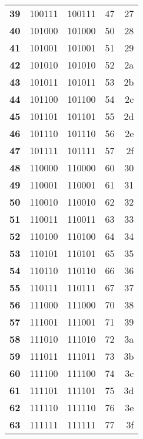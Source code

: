 \documentclass[a4paper]{article}
\begin{document}
\begin{tabular}{|>{\bfseries}r | r | r | r | r |}
39&100111&100111&47&27\\
40&101000&101000&50&28\\
41&101001&101001&51&29\\
42&101010&101010&52&2a\\
43&101011&101011&53&2b\\
44&101100&101100&54&2c\\
45&101101&101101&55&2d\\
46&101110&101110&56&2e\\
47&101111&101111&57&2f\\
48&110000&110000&60&30\\
49&110001&110001&61&31\\
50&110010&110010&62&32\\
51&110011&110011&63&33\\
52&110100&110100&64&34\\
53&110101&110101&65&35\\
54&110110&110110&66&36\\
55&110111&110111&67&37\\
56&111000&111000&70&38\\
57&111001&111001&71&39\\
58&111010&111010&72&3a\\
59&111011&111011&73&3b\\
60&111100&111100&74&3c\\
61&111101&111101&75&3d\\
62&111110&111110&76&3e\\
63&111111&111111&77&3f\\
\end{tabular}
\hspace*{3.0cm}
\end{document}
